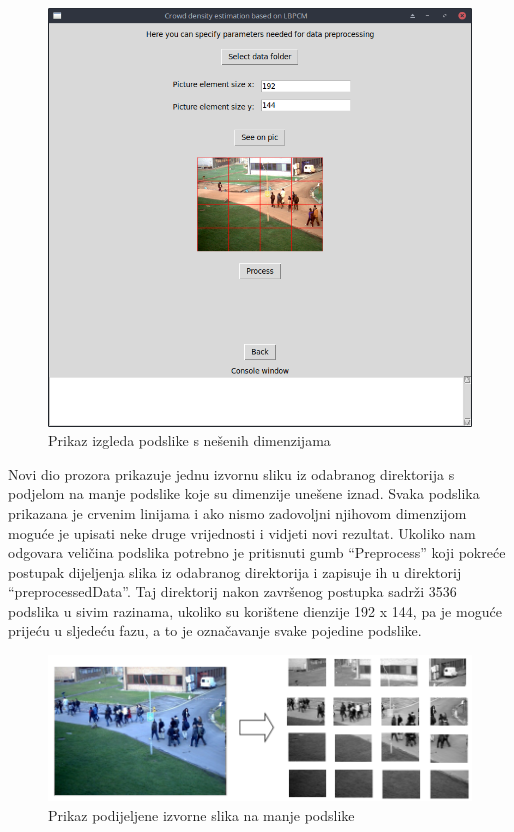 \documentclass[times, utf8, zavrsni]{fer}
\begin{document}
\begin{figure}[ht]
\centering
\includegraphics[scale=0.4]{img/seeonpic.png}
\caption{Prikaz izgleda podslike s nešenih dimenzijama}
\end{figure}

Novi dio prozora prikazuje jednu izvornu sliku iz odabranog direktorija
s podjelom na manje podslike koje su dimenzije unešene iznad. Svaka podslika
prikazana je crvenim linijama i ako nismo zadovoljni njihovom dimenzijom
moguće je upisati neke druge vrijednosti i vidjeti novi rezultat. Ukoliko 
nam odgovara veličina podslika potrebno je pritisnuti gumb \enquote{Preprocess}
koji pokreće postupak dijeljenja slika iz odabranog direktorija i zapisuje ih u 
direktorij \enquote{preprocessedData}. Taj direktorij nakon završenog postupka
sadrži 3536 podslika u sivim razinama, ukoliko su korištene dienzije 192 x 144, 
pa je moguće prijeću u sljedeću fazu, a to je označavanje svake pojedine podslike.

\newpage

\begin{figure}[ht]
\centering
\includegraphics[scale=0.4]{img/splitted.png}
\caption{Prikaz podijeljene izvorne slika na manje podslike}
\end{figure}
\end{document}
